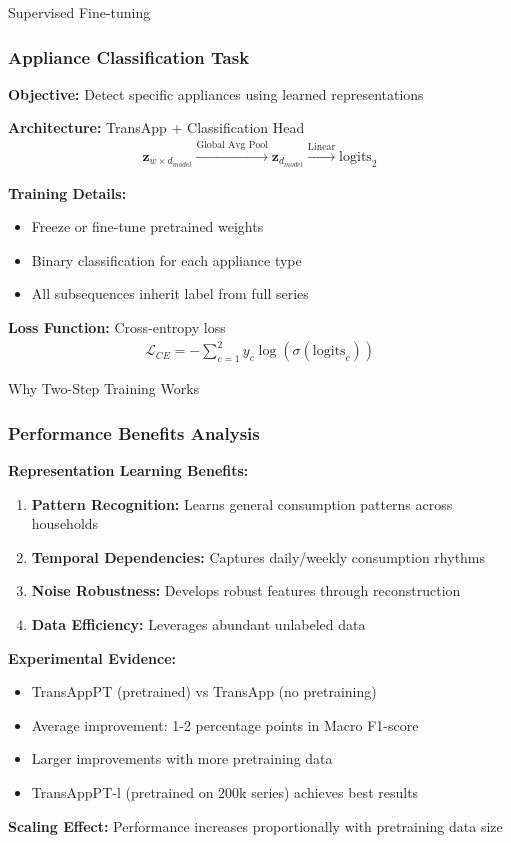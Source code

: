 \documentclass{beamer}
\begin{document}
\begin{frame}{Supervised Fine-tuning}
\frametitle{Appliance Classification Task}

\textbf{Objective:} Detect specific appliances using learned representations

\textbf{Architecture:} TransApp + Classification Head
\begin{align}
\mathbf{z}_{w \times d_{model}} \xrightarrow{\text{Global Avg Pool}} \mathbf{z}_{d_{model}} \xrightarrow{\text{Linear}} \text{logits}_2
\end{align}

\textbf{Training Details:}
\begin{itemize}
    \item Freeze or fine-tune pretrained weights
    \item Binary classification for each appliance type
    \item All subsequences inherit label from full series
\end{itemize}

\vspace{0.3cm}

\textbf{Loss Function:} Cross-entropy loss
\begin{align}
\mathcal{L}_{CE} = -\sum_{c=1}^{2} y_c \log(\sigma(\text{logits}_c))
\end{align}

\end{frame}

\begin{frame}{Why Two-Step Training Works}
\frametitle{Performance Benefits Analysis}

\textbf{Representation Learning Benefits:}
\begin{enumerate}
    \item \textbf{Pattern Recognition:} Learns general consumption patterns across households
    \item \textbf{Temporal Dependencies:} Captures daily/weekly consumption rhythms
    \item \textbf{Noise Robustness:} Develops robust features through reconstruction
    \item \textbf{Data Efficiency:} Leverages abundant unlabeled data
\end{enumerate}

\vspace{0.3cm}

\textbf{Experimental Evidence:}
\begin{itemize}
    \item TransAppPT (pretrained) vs TransApp (no pretraining)
    \item Average improvement: 1-2 percentage points in Macro F1-score
    \item Larger improvements with more pretraining data
    \item TransAppPT-l (pretrained on 200k series) achieves best results
\end{itemize}

\vspace{0.3cm}

\textbf{Scaling Effect:} Performance increases proportionally with pretraining data size
\end{frame}
\end{document}
